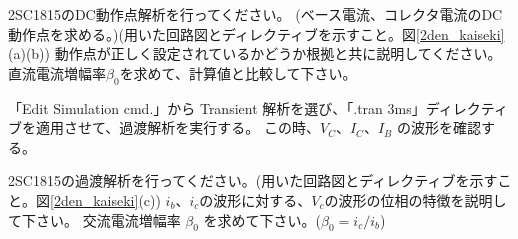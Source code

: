\begin{description}
  \setlength{\parskip}{0cm} %
  \setlength{\itemsep}{0cm} %
  \item[課題5] 2SC1815のDC動作点解析を行ってください。
  (ベース電流、コレクタ電流のDC動作点を求める。)(用いた回路図とディレクティブを示すこと。図\ref{2den_kaiseki}(a)(b))
  動作点が正しく設定されているかどうか根拠と共に説明してください。
  直流電流増幅率$\beta_0$を求めて、計算値と比較して下さい。
\end{description}

「Edit Simulation cmd.」から Transient 解析を選び、「.tran 3ms」ディレクティブを適用させて、過渡解析を実行する。
この時、$V_C、I_C、I_B$ の波形を確認する。


\begin{description}
  \setlength{\parskip}{0cm} %
  \setlength{\itemsep}{0cm} %
  \item [課題6] 2SC1815の過渡解析を行ってください。(用いた回路図とディレクティブを示すこと。図\ref{2den_kaiseki}(c))
  $i_b$、$i_c$の波形に対する、$V_{c}$の波形の位相の特徴を説明して下さい。
  交流電流増幅率 $\beta_0$ を求めて下さい。($\beta_0 = i_c/i_b$)
\end{description}